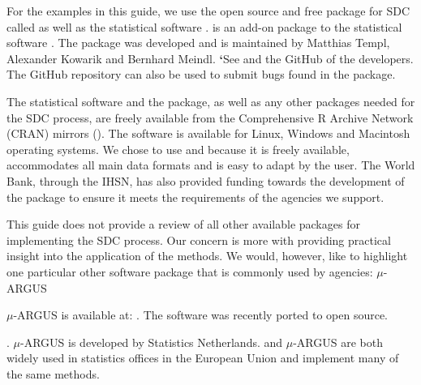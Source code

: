 \documentclass[letterpaper,10pt,english]{sphinxmanual}
\begin{document}
For the examples in this guide, we use the open source and free package
for SDC called  as well as the statistical software .
 is an add-on package to the statistical software . The
package was developed and is maintained by Matthias Templ, Alexander
Kowarik and Bernhard Meindl. {\color{red}\bfseries{}{}`}See and the GitHub of the developers. The
GitHub repository can also be used to submit bugs found in the
package. %
\begin{footnote}[2]\sphinxAtStartFootnote
{}
%
\end{footnote} The statistical software  and the 
package, as well as any other packages needed for the SDC process, are
freely available from the Comprehensive R Archive Network (CRAN) mirrors
(). The software is available for Linux,
Windows and Macintosh operating systems. We chose to use  and
 because it is freely available, accommodates all main data
formats and is easy to adapt by the user. The World Bank, through the
IHSN, has also provided funding towards the development of the
 package to ensure it meets the requirements of the agencies
we support.

This guide does not provide a review of all other available packages for
implementing the SDC process. Our concern is more with providing
practical insight into the application of the methods. We would,
however, like to highlight one particular other software package that is
commonly used by agencies: \(\mu\)-ARGUS %
\begin{footnote}[3]\sphinxAtStartFootnote
\(\mu\)-ARGUS is available at: . The
software was recently ported to open source.
%
\end{footnote}. \(\mu\)-ARGUS is
developed by Statistics Netherlands.  and \(\mu\)-ARGUS are both
widely used in statistics offices in the European Union and implement
many of the same methods.
\end{document}
